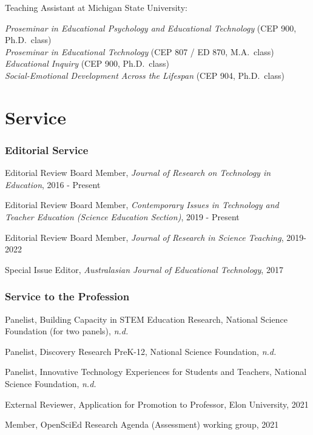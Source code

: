 \documentclass[
  14,
]{article}
\begin{document}
Teaching Assistant at Michigan State University:

\emph{Proseminar in Educational Psychology and Educational Technology}
(CEP 900, Ph.D.~class)\\
\emph{Proseminar in Educational Technology} (CEP 807 / ED 870,
M.A.~class)\\
\emph{Educational Inquiry} (CEP 900, Ph.D.~class)\\
\emph{Social-Emotional Development Across the Lifespan} (CEP 904,
Ph.D.~class)

\hypertarget{service}{%
\section{Service}\label{service}}

\hypertarget{editorial-service}{%
\subsubsection{Editorial Service}\label{editorial-service}}

Editorial Review Board Member, \emph{Journal of Research on Technology
in Education}, 2016 - Present

Editorial Review Board Member, \emph{Contemporary Issues in Technology
and Teacher Education (Science Education Section)}, 2019 - Present

Editorial Review Board Member, \emph{Journal of Research in Science
Teaching}, 2019-2022

Special Issue Editor, \emph{Australasian Journal of Educational
Technology}, 2017

\hypertarget{service-to-the-profession}{%
\subsubsection{Service to the
Profession}\label{service-to-the-profession}}

Panelist, Building Capacity in STEM Education Research, National Science
Foundation (for two panels), \emph{n.d.}

Panelist, Discovery Research PreK-12, National Science Foundation,
\emph{n.d.}

Panelist, Innovative Technology Experiences for Students and Teachers,
National Science Foundation, \emph{n.d.}

External Reviewer, Application for Promotion to Professor, Elon
University, 2021

Member, OpenSciEd Research Agenda (Assessment) working group, 2021
\end{document}
